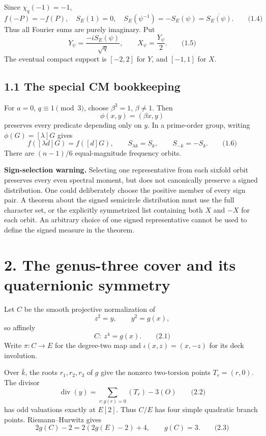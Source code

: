 \documentclass[
  11pt,
  a4paper,
]{article}
\begin{document}
Since \(\chi_q(-1)=-1\), \[
f(-P)=-f(P),\quad S_E(1)=0,\quad
S_E(\psi^{-1})=-S_E(\psi)=\overline{S_E(\psi)}.
\qquad \text{(1.4)}
\] Thus all Fourier sums are purely imaginary. Put \[
Y_\psi=\frac{-iS_E(\psi)}{\sqrt q},\qquad
X_\psi=\frac{Y_\psi}{2}.
\qquad \text{(1.5)}
\] The eventual compact support is \([-2,2]\) for \(Y\), and \([-1,1]\)
for \(X\).

\subsection{1.1 The special CM
bookkeeping}\label{the-special-cm-bookkeeping}

For \(a=0\), \(q\equiv1\pmod3\), choose \(\beta^3=1\), \(\beta\ne1\).
Then \[
\phi(x,y)=(\beta x,y)
\] preserves every predicate depending only on \(y\). In a prime-order
group, writing \(\phi(G)=[\lambda]G\) gives \[
f([\lambda d]G)=f([d]G),\qquad
S_{\lambda k}=S_k,\qquad S_{-k}=-S_k.
\qquad \text{(1.6)}
\] There are \((n-1)/6\) equal-magnitude frequency orbits.

\textbf{Sign-selection warning.} Selecting one representative from each
sixfold orbit preserves every even spectral moment, but does not
canonically preserve a signed distribution. One could deliberately
choose the positive member of every sign pair. A theorem about the
signed semicircle distribution must use the full character set, or the
explicitly symmetrized list containing both \(X\) and \(-X\) for each
orbit. An arbitrary choice of one signed representative cannot be used
to define the signed measure in the theorem.

\section{2. The genus-three cover and its quaternionic
symmetry}\label{the-genus-three-cover-and-its-quaternionic-symmetry}

Let \(C\) be the smooth projective normalization of \[
z^2=y,\qquad y^2=g(x),
\] so affinely \[
C:\ z^4=g(x).
\qquad \text{(2.1)}
\] Write \(\pi:C\to E\) for the degree-two map and \(\iota(x,z)=(x,-z)\)
for its deck involution.

Over \(\bar k\), the roots \(r_1,r_2,r_3\) of \(g\) give the nonzero
two-torsion points \(T_r=(r,0)\). The divisor \[
\operatorname{div}(y)=\sum_{r:g(r)=0}(T_r)-3(O)
\qquad \text{(2.2)}
\] has odd valuations exactly at \(E[2]\). Thus \(C/E\) has four simple
quadratic branch points. Riemann--Hurwitz gives \[
2g(C)-2=2(2g(E)-2)+4,
\qquad g(C)=3.
\qquad \text{(2.3)}
\]
\end{document}
